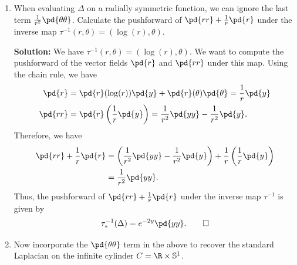 \documentclass[notitlepage]{report}
\renewcommand\S{\mathbb{S}}
\begin{document}
\begin{enumerate}
      \begin{align*}
        4Df &= \left(\pd{rr} f + \frac{i}{r} \pd{r\theta} f - \frac{i}{r} \pd{\theta r} f + \frac{1}{r^2} \pd{\theta\theta} f\right) \\
            &= \pd{r} \left(\pd{r}f + \frac{i}{r}\pd{\theta}f\right) - \frac{i}{r}\pd{\theta}\left(\pd{r}f + \frac{i}{r}\pd{\theta}f\right) \\
            &= \pd{rr}f + \pd{r} \left(\frac{i}{r}\pd{\theta}f\right) - \frac{i}{r}\pd{\theta,r}f + \frac{1}{r^2}\pd{\theta\theta}f \\
            &= \pd{rr}f - \frac{i}{r^2} \pd{\theta}f + \frac{i}{r}\pd{r,\theta}f - \frac{i}{r}\pd{\theta,r}f + \frac{1}{r^2}\pd{\theta\theta}f \\
            &= \pd{rr}f - \frac{i}{r^2} \pd{\theta}f + \frac{1}{r^2}\pd{\theta\theta}f
      .\end{align*}

    \item When evaluating $\Delta$ on a radially symmetric function, we can ignore the last term $\frac{1}{r^2} \pd{\theta\theta}$. Calculate the pushforward of $\pd{rr} + \frac{1}{r} \pd{r}$ under the inverse map $\tau^{-1}(r, \theta) = (\log(r), \theta)$.

      \textbf{Solution:} We have $\tau^{-1}(r, \theta) = (\log(r), \theta)$. We want to compute the pushforward of the vector fields $\pd{r}$ and $\pd{rr}$ under this map. Using the chain rule, we have
      \begin{align*}
        \pd{r} &= \pd{r}(\log(r)) \pd{y} + \pd{r}(\theta) \pd{\theta} = \frac{1}{r} \pd{y} \\
        \pd{rr} &= \pd{r}\left(\frac{1}{r} \pd{y}\right) = \frac{1}{r^2} \pd{yy} - \frac{1}{r^2} \pd{y}
      .\end{align*}
      Therefore, we have
      \begin{align*}
        \pd{rr} + \frac{1}{r} \pd{r} &= \left(\frac{1}{r^2} \pd{yy} - \frac{1}{r^2} \pd{y}\right) + \frac{1}{r} \left(\frac{1}{r} \pd{y}\right) \\
                                     &= \frac{1}{r^2} \pd{yy}
      .\end{align*}
      Thus, the pushforward of $\pd{rr} + \frac{1}{r} \pd{r}$ under the inverse map $\tau^{-1}$ is given by
      \[%
        \tau_*^{-1}(\Delta) = e^{-2y} \pd{yy}
      .\tag*{$\square$}\]%

    \item Now incorporate the $\pd{\theta\theta}$ term in the above to recover the standard Laplacian on the infinite cylinder $C = \R \times \S^1$.


\end{enumerate}
\end{document}
